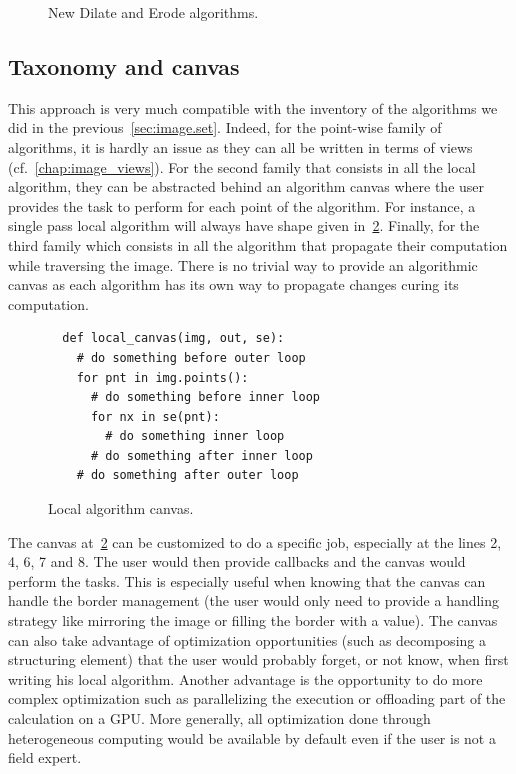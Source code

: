 \begin{figure}[htbp]
  \centering
  \vfil
  \smallskip
  \hfil
  \caption{New Dilate and Erode algorithms.}
  \label{code:erode.dilate.factorized}
\end{figure}

\subsection{Taxonomy and canvas}
\label{subsec.taxonomy.canvas}

This approach is very much compatible with the inventory of the algorithms we did in the previous~\cref{sec:image.set}.
Indeed, for the point-wise family of algorithms, it is hardly an issue as they can all be written in terms of views
(cf.~\cref{chap:image_views}). For the second family that consists in all the local algorithm, they can be abstracted
behind an algorithm canvas where the user provides the task to perform for each point of the algorithm. For instance, a
single pass local algorithm will always have shape given in~\cref{code:local.algorithm.canvas}. Finally, for the third
family which consists in all the algorithm that propagate their computation while traversing the image. There is no
trivial way to provide an algorithmic canvas as each algorithm has its own way to propagate changes curing its
computation.

\begin{figure}[htbp]
  \centering
  \begin{verbatim}
  def local_canvas(img, out, se):
    # do something before outer loop
    for pnt in img.points():
      # do something before inner loop
      for nx in se(pnt):
        # do something inner loop
      # do something after inner loop
    # do something after outer loop
  \end{verbatim}

  \caption{Local algorithm canvas.}
  \label{code:local.algorithm.canvas}
\end{figure}

The canvas at~\cref{code:local.algorithm.canvas} can be customized to do a specific job, especially at the lines 2, 4,
6, 7 and 8. The user would then provide callbacks and the canvas would perform the tasks. This is especially useful when
knowing that the canvas can handle the border management (the user would only need to provide a handling strategy like
mirroring the image or filling the border with a value). The canvas can also take advantage of optimization
opportunities (such as decomposing a structuring element) that the user would probably forget, or not know, when first
writing his local algorithm. Another advantage is the opportunity to do more complex optimization such as parallelizing
the execution or offloading part of the calculation on a GPU. More generally, all optimization done through
heterogeneous computing would be available by default even if the user is not a field expert.

